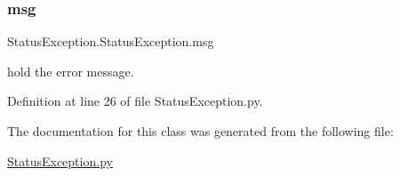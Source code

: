 \subsubsection{\texorpdfstring{msg}{msg}}
{\footnotesize\ttfamily Status\+Exception.\+Status\+Exception.\+msg}



hold the error message. 



Definition at line 26 of file Status\+Exception.\+py.



The documentation for this class was generated from the following file\+:\begin{DoxyCompactItemize}
\item 
\hyperlink{StatusException_8py}{Status\+Exception.\+py}\end{DoxyCompactItemize}

